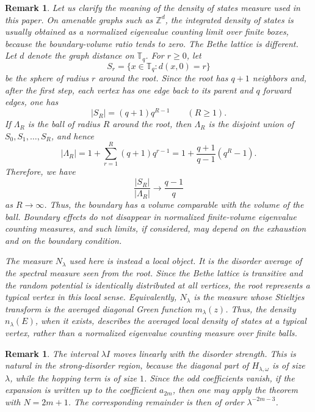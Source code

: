 \documentclass[a4paper,11pt]{article}
\newtheorem{rem}[thm]{Remark}
\begin{document}
\begin{rem}
Let us clarify the meaning of the density of states measure used in this paper.
On amenable graphs such as $\mathbb Z^d$, the integrated density
of states is usually obtained as a normalized eigenvalue counting limit
over finite boxes, because the boundary-volume ratio tends to zero.  
The Bethe lattice is different.
%
Let $d$ denote the graph distance on $\mathbb T_q$.  
For $r\ge0$, let
$$
S_r=\{x\in\mathbb T_q:d(x,0)=r\}
$$
be the sphere of radius $r$ around the root.  
Since the root has $q+1$ neighbors and, after the first step, 
each vertex has one edge back to its parent and $q$ forward edges, one has
$$
|S_R|=(q+1)q^{R-1}\qquad (R\ge 1).
$$
If $\Lambda_R$ is the ball of radius $R$ around the root, then
$\Lambda_R$ is the disjoint union of $S_0,S_1,\ldots,S_R$, and hence
$$
|\Lambda_R|=1+\sum_{r=1}^R (q+1)q^{r-1}=1+\frac{q+1}{q-1}(q^R-1).
$$
Therefore, we have
$$
\frac{|S_R|}{|\Lambda_R|}\to\frac{q-1}{q}
$$
as $R\to\infty$.
Thus, the boundary has a volume comparable with the volume of the ball.
Boundary effects do not disappear in normalized
finite-volume eigenvalue counting measures, and such limits, if
considered, may depend on the exhaustion and on the boundary condition.

The measure $N_\lambda$ used here is instead a local object.  
It is the disorder average of the spectral measure seen from the root.
Since the Bethe lattice is transitive and the random potential is identically
distributed at all vertices, the root represents a typical vertex in this local sense.
Equivalently, $N_\lambda$ is the measure whose Stieltjes
transform is the averaged diagonal Green function $m_\lambda(z)$.
Thus, the density $n_\lambda(E)$, when it exists, describes the averaged local
density of states at a typical vertex, rather than a normalized
eigenvalue counting measure over finite balls.
\end{rem}

\begin{rem}
The interval $\lambda I$ moves linearly with the disorder strength.
This is natural in the strong-disorder region, because the diagonal part
of $H_{\lambda,\omega}$ is of size $\lambda$, while the hopping term is of size $1$. 
Since the odd coefficients vanish, if the expansion is
written up to the coefficient $a_{2m}$, then one may apply the theorem with $N=2m+1$.
The corresponding remainder is then of order $\lambda^{-2m-3}$.
\end{rem}
\end{document}
